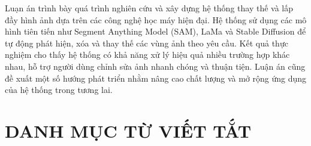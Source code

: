 \documentclass[12pt]{report}
\begin{document}
Luạn án trình bày quá trình nghiên cứu và xây dựng hệ thống thay thế và lấp đầy hình ảnh dựa trên các công nghệ học máy hiện đại. Hệ thống sử dụng các mô hình tiên tiến như Segment Anything Model (SAM), LaMa và Stable Diffusion để tự động phát hiện, xóa và thay thế các vùng ảnh theo yêu cầu. Kết quả thực nghiệm cho thấy hệ thống có khả năng xử lý hiệu quả nhiều trường hợp khác nhau, hỗ trợ người dùng chỉnh sửa ảnh nhanh chóng và thuận tiện. Luận án cũng đề xuất một số hướng phát triển nhằm nâng cao chất lượng và mở rộng ứng dụng của hệ thống trong tương lai.

\tableofcontents
\clearpage
{}
\listoffigures
{}
\listoftables     
\chapter*{DANH MỤC TỪ VIẾT TẮT}
\end{document}
